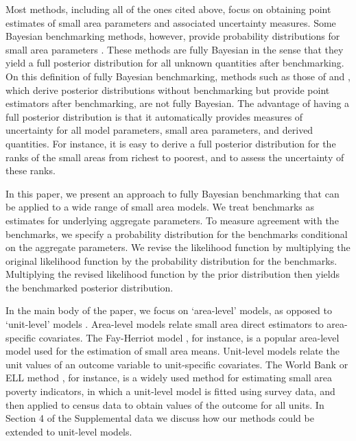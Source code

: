 \documentclass[12pt]{article}
\begin{document}
Most methods, including all of the ones cited above, focus on obtaining point estimates of small area parameters and associated uncertainty measures.  Some Bayesian benchmarking methods, however, provide probability distributions for small area parameters \citep{toto2010bayesian,nandram2011bayesian,nandram2011constraint,vesper2013three}.  These methods are fully Bayesian in the sense that they yield a full posterior distribution for all unknown quantities after benchmarking.  On this definition of fully Bayesian benchmarking, methods such as those of \citet{you2004benchmarking} and \citet{datta2011bayesian}, which derive posterior distributions without benchmarking but provide point estimators after benchmarking, are not fully Bayesian. The advantage of having a full posterior distribution is that it automatically  provides measures of uncertainty for all model parameters, small area parameters, and derived quantities.  For instance, it is easy to derive a full posterior distribution for the ranks of the small areas from richest to poorest, and to assess the uncertainty of these ranks.

In this paper, we present an approach to fully Bayesian benchmarking that can be applied to a wide range of small area models. We treat benchmarks as estimates for underlying aggregate parameters.  To measure agreement with the benchmarks, we specify a probability distribution for the benchmarks conditional on the aggregate parameters. We revise the likelihood function by multiplying the original likelihood function by the probability distribution for the benchmarks.  Multiplying the revised likelihood function by the prior distribution then yields the benchmarked posterior distribution.

In the main body of the paper, we focus on `area-level' models, as opposed to `unit-level' models \citep{rao2015small}.  Area-level models relate small area direct estimators to area-specific covariates.  The Fay-Herriot model \citep{fay1979estimates}, for instance, is a popular area-level model used for the estimation of small area means. Unit-level models relate the unit values of an outcome variable to unit-specific covariates.  The World Bank or ELL method \citep{elbers2003micro}, for instance, is a widely used method for estimating small area poverty indicators, in which a unit-level model is fitted using survey data, and then applied to census data to obtain values of the outcome for all units.  In Section 4 of the Supplemental data we discuss how our methods could be extended to unit-level models.
\end{document}
